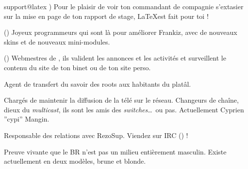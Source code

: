 \begin{description}
  \item{support@latex} {) Pour le plaisir de voir ton commandant de compagnie s'extasier sur la mise en page de ton rapport de stage, \LaTeX est fait pour toi !}

  \item[dev]{() Joyeux programmeurs qui sont l\`a pour am\'eliorer Frankiz, avec de nouveaux skins et de nouveaux mini-modules.}


  \item[web] {() Webmestres de \fkz, ils valident les annonces et les activit\'es et surveillent le contenu du site de ton binet ou de ton site perso.}


  \item[InfoBR]{Agent de transfert du savoir des roots aux habitants du plat\^al.}

  \item[support@tv]{Charg\'es de maintenir la diffusion de la t\'el\'e sur le r\'eseau. Changeurs de cha\^ine, dieux du \emph{multicast},
  ils sont les amis des \emph{switches}\dots\ ou pas. Actuellement Cyprien ''cypi'' Mangin.}


  \item[IRC-Op]{Responsable des relations avec RezoSup. Viendez sur IRC () !}


  \item[BR-woman]{Preuve vivante que le BR n'est pas un milieu enti\`erement masculin. Existe actuellement en deux modèles, brune et blonde.}

\end{description}

